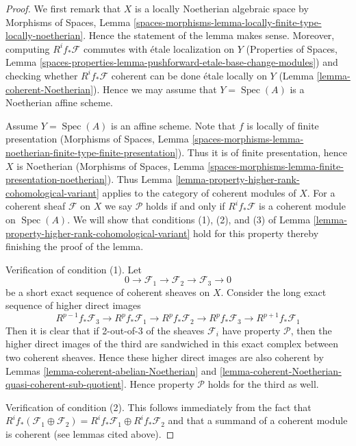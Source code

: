 \documentclass{stacks-project}
\theoremstyle{plain}
\theoremstyle{definition}
\theoremstyle{remark}
\numberwithin{equation}{subsection}
\def\Spec{\mathop{\mathrm{Spec}}}
\begin{document}
\begin{proof}
We first remark that $X$ is a locally Noetherian algebraic space
by Morphisms of Spaces, Lemma
\ref{spaces-morphisms-lemma-locally-finite-type-locally-noetherian}.
Hence the statement of the lemma makes sense. Moreover, computing
$R^if_*\mathcal{F}$ commutes with \'etale localization on $Y$
(Properties of Spaces, Lemma
\ref{spaces-properties-lemma-pushforward-etale-base-change-modules})
and checking whether $R^if_*\mathcal{F}$ coherent can be done
\'etale locally on $Y$ (Lemma \ref{lemma-coherent-Noetherian}).
Hence we may assume that $Y = \Spec(A)$ is a Noetherian affine scheme.

\medskip\noindent
Assume $Y = \Spec(A)$ is an affine scheme. Note that $f$ is locally
of finite presentation
(Morphisms of Spaces, Lemma
\ref{spaces-morphisms-lemma-noetherian-finite-type-finite-presentation}).
Thus it is of finite presentation, hence $X$ is Noetherian
(Morphisms of Spaces, Lemma
\ref{spaces-morphisms-lemma-finite-presentation-noetherian}).
Thus Lemma \ref{lemma-property-higher-rank-cohomological-variant}
applies to the category of coherent modules of $X$.
For a coherent sheaf $\mathcal{F}$ on $X$ we say $\mathcal{P}$ holds
if and only if $R^if_*\mathcal{F}$ is a coherent module on $\Spec(A)$.
We will show that conditions (1), (2), and (3) of
Lemma \ref{lemma-property-higher-rank-cohomological-variant} hold
for this property thereby finishing the proof of the lemma.

\medskip\noindent
Verification of condition (1). Let
$$
0 \to \mathcal{F}_1 \to \mathcal{F}_2 \to \mathcal{F}_3 \to 0
$$
be a short exact sequence of coherent sheaves on $X$.
Consider the long exact sequence of higher direct images
$$
R^{p - 1}f_*\mathcal{F}_3 \to
R^pf_*\mathcal{F}_1 \to
R^pf_*\mathcal{F}_2 \to
R^pf_*\mathcal{F}_3 \to
R^{p + 1}f_*\mathcal{F}_1
$$
Then it is clear that if 2-out-of-3 of the sheaves $\mathcal{F}_i$
have property $\mathcal{P}$, then the higher direct images of the
third are sandwiched in this exact complex between two coherent
sheaves. Hence these higher direct images are also coherent by
Lemmas \ref{lemma-coherent-abelian-Noetherian} and
\ref{lemma-coherent-Noetherian-quasi-coherent-sub-quotient}.
Hence property $\mathcal{P}$ holds for the third as well.

\medskip\noindent
Verification of condition (2). This follows immediately from the fact
that $R^if_*(\mathcal{F}_1 \oplus \mathcal{F}_2) =
R^if_*\mathcal{F}_1 \oplus R^if_*\mathcal{F}_2$ and that a summand
of a coherent module is coherent (see lemmas cited above).


\end{proof}
\end{document}
